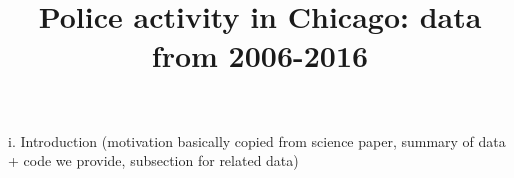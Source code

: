 \documentclass{article}
\title{Police activity in Chicago: data from 2006-2016}
\author{}
\begin{document}
\maketitle

\begin{abstract}
 \end{abstract}

i. Introduction (motivation basically copied from science paper, summary of data + code we provide, subsection for related data)





\end{document}
